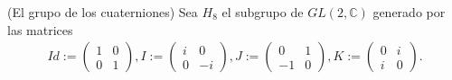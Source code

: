 \question 
(El grupo de los cuaterniones) Sea $H_8$ el subgrupo de $GL(2,\mathbb{C})$ generado por las matrices 
\begin{align*}
Id:=
 \begin{pmatrix}
  1 & 0 \\
  0 & 1
 \end{pmatrix},
I:=
 \begin{pmatrix}
  i & 0 \\
  0 & -i
 \end{pmatrix},
J:=
 \begin{pmatrix}
  0 & 1 \\
  -1 & 0
 \end{pmatrix},
K:=
 \begin{pmatrix}
  0 & i \\
  i & 0
 \end{pmatrix}.
\end{align*}
